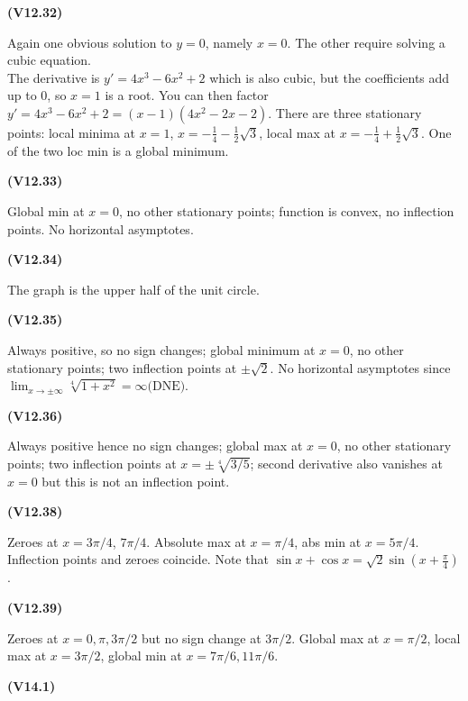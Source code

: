 \documentclass[openany,reqno]{amsbook}
\begin{document}
\begin{trivlist}
\item[{\bf(V12.32)}]

  Again one obvious solution to $y=0$, namely $x=0$.  The other
  require solving a cubic equation.\\ The derivative is
  $y'=4x^3-6x^2+2$ which is also cubic, but the coefficients add up to
  0, so $x=1$ is a root.  You can then factor
  $y'=4x^3-6x^2+2=(x-1)(4x^2-2x-2)$.  There are three stationary
  points: local minima at $x=1$, $x=-\frac14 - \frac12\surd3$, local
  max at $x=-\frac14 + \frac12\surd3$.  One of the two loc min is a
  global minimum.
  \bigskip

\item[{\bf(V12.33)}]

  Global min at $x=0$, no other stationary points;  function is
  convex, no inflection points.  No horizontal asymptotes.
  \bigskip

\item[{\bf(V12.34)}]

  The graph is the upper half of the unit circle.
  \bigskip

\item[{\bf(V12.35)}]

  Always positive, so no sign changes;  global minimum at $x=0$, no
  other stationary points; two inflection points at $\pm\surd2$.  No
  horizontal asymptotes since $\lim_{x\to\pm\infty} \sqrt[4]{1+x^2} =
  \infty \textrm{(DNE)}$.
  \bigskip

\item[{\bf(V12.36)}]

  Always positive hence no sign changes; global max at $x=0$, no other
  stationary points;  two inflection points at $x=\pm\sqrt[4]{3/5}$;
  second derivative also vanishes at $x=0$ but this is not an
  inflection point.
  \bigskip

\item[{\bf(V12.38)}]

  Zeroes at $x=3\pi/4$, $7\pi/4$. Absolute max at $x=\pi/4$, abs min at
  $x=5\pi/4$.  Inflection points and zeroes coincide.  Note that
  $\sin x+\cos x = \sqrt2 \sin(x+\frac\pi4)$.
  \bigskip

\item[{\bf(V12.39)}]

  Zeroes at $x=0, \pi, 3\pi/2$ but no sign change at $3\pi/2$.  Global
  max at $x=\pi/2$, local max at $x=3\pi/2$, global min at $x=7\pi/6,
  11\pi/6$.
  \bigskip

\item[{\bf(V14.1)}]


\end{trivlist}
\end{document}
